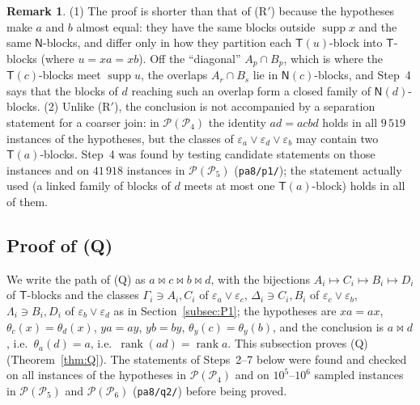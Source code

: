 \documentclass[11pt]{amsart}
\theoremstyle{definition}
\newtheorem{remark}[theorem]{Remark}
\renewcommand{\P}{\mathcal{P}}
\newcommand{\supp}{\operatorname{supp}}
\newcommand{\T}{\mathsf{T}}
\newcommand{\N}{\mathsf{N}}
\newcommand{\rk}{\operatorname{rank}}
\begin{document}
\begin{remark}\label{rem:P1}
(1) The proof is shorter than that of (R$'$) because the hypotheses make $a$ and $b$ almost equal: they have the same blocks outside $\supp x$ and the same $\N$-blocks, and differ only in how they partition each $\T(u)$-block into $\T$-blocks (where $u=xa=xb$). Off the ``diagonal'' $A_p\cap B_p$, which is where the $\T(c)$-blocks meet $\supp u$, the overlaps $A_r\cap B_s$ lie in $\N(c)$-blocks, and Step~4 says that the blocks of $d$ reaching such an overlap form a closed family of $\N(d)$-blocks. (2) Unlike (R$'$), the conclusion is not accompanied by a separation statement for a coarser join: in $\P(\P_4)$ the identity $ad=acbd$ holds in all $9\,519$ instances of the hypotheses, but the classes of $\varepsilon_a\vee\varepsilon_d\vee\varepsilon_b$ may contain two $\T(a)$-blocks. Step~4 was found by testing candidate statements on those instances and on $41\,918$ instances in $\P(\P_5)$ (\texttt{pa8/p1/}); the statement actually used (a linked family of blocks of $d$ meets at most one $\T(a)$-block) holds in all of them.
\end{remark}

\subsection{Proof of (Q)}\label{subsec:Q}

We write the path of (Q) as $a\bowtie c\bowtie b\bowtie d$, with the bijections $A_i\mapsto C_i\mapsto B_i\mapsto D_i$ of $\T$-blocks and the classes $\Gamma_i\ni A_i,C_i$ of $\varepsilon_a\vee\varepsilon_c$, $\Delta_i\ni C_i,B_i$ of $\varepsilon_c\vee\varepsilon_b$, $\Lambda_i\ni B_i,D_i$ of $\varepsilon_b\vee\varepsilon_d$ as in Section~\ref{subsec:P1}; the hypotheses are $xa=ax$, $\theta_c(x)=\theta_d(x)$, $ya=ay$, $yb=by$, $\theta_y(c)=\theta_y(b)$, and the conclusion is $a\bowtie d$, i.e.\ $\theta_a(d)=a$, i.e.\ $\rk(ad)=\rk a$. This subsection proves (Q) (Theorem~\ref{thm:Q}). The statements of Steps~2--7 below were found and checked on all instances of the hypotheses in $\P(\P_4)$ and on $10^5$--$10^6$ sampled instances in $\P(\P_5)$ and $\P(\P_6)$ (\texttt{pa8/q2/}) before being proved.
\end{document}
